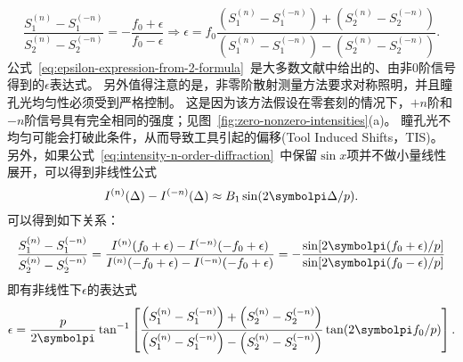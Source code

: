\begin{equation}\label{eq:epsilon-expression-from-2-formula}
\frac{S_1^{(n)}-S_1^{(-n)}}{S_2^{(n)}-S_2^{(-n)}} = - \frac{f_0+\epsilon}{f_0-\epsilon}
\Longrightarrow
\epsilon = f_0\frac{\left(S_1^{(n)}-S_1^{(-n)}\right)+\left(S_2^{(n)}-S_2^{(-n)}\right)}{\left(S_1^{(n)}-S_1^{(-n)}\right)-\left(S_2^{(n)}-S_2^{(-n)}\right)}.
\end{equation}
公式~\eqref{eq:epsilon-expression-from-2-formula}~是大多数文献中给出的、由非0阶信号得到的$\epsilon$表达式。
另外值得注意的是，非零阶散射测量方法要求对称照明，并且瞳孔光均匀性必须受到严格控制。
这是因为该方法假设在零套刻的情况下，$+n$阶和$-n$阶信号具有完全相同的强度；见图~\ref{fig:zero-nonzero-intensities}(a)。
瞳孔光不均匀可能会打破此条件，从而导致工具引起的偏移(Tool Induced Shifts，TIS)。
\\
另外，如果公式~\eqref{eq:intensity-n-order-diffraction}~中保留$\sin x$项并不做小量线性展开，可以得到非线性公式
\begin{equation}\label{eq:nonzero-order-approximate-formula-nonlinear}
I^{(n)}(\Delta)-I^{(-n)}(\Delta) \approx B_1 \sin(2\symbolpi\Delta/p).
\end{equation}
可以得到如下关系：
\begin{equation}\label{eq:epsilon-expression-from-2-formula-derivation-nonlinear}
\frac{S_1^{(n)}-S_1^{(-n)}}{S_2^{(n)}-S_2^{(-n)}} 
= \frac{I^{(n)}(f_0+\epsilon)-I^{(-n)}(-f_0+\epsilon)}{I^{(n)}(-f_0+\epsilon)-I^{(-n)}(-f_0+\epsilon)}
= - \frac{\sin[2\symbolpi(f_0+\epsilon)/p]}{\sin[2\symbolpi(f_0-\epsilon)/p]}
\end{equation}
即有非线性下$\epsilon$的表达式~\cite{blancquaert2013diffraction}
\begin{equation}\label{eq:epsilon-expression-from-2-formula-nonlinear}
\epsilon
= \frac{p}{2\symbolpi} \tan^{-1} \left[
\frac{\left(S_1^{(n)}-S_1^{(-n)}\right)+\left(S_2^{(n)}-S_2^{(-n)}\right)}{\left(S_1^{(n)}-S_1^{(-n)}\right)-\left(S_2^{(n)}-S_2^{(-n)}\right)}
\tan(2\symbolpi f_0/p)\right].
\end{equation}
